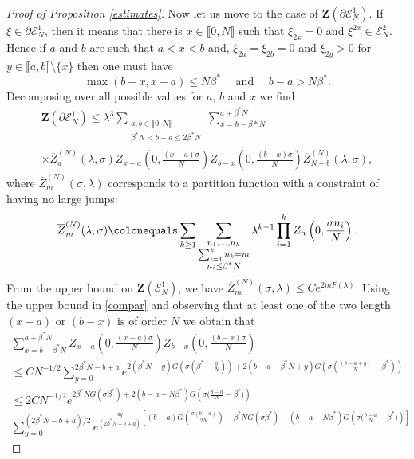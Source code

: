 \documentclass[reqno,11pt]{amsart}
\numberwithin{equation}{section}
\newcommand{\gl}{\lambda}
\newcommand{\cE}{{\ensuremath{\mathcal E}} }
\newcommand{\bZ}{{\ensuremath{\mathbf Z}} }
\newcommand{\lint}{\llbracket}
\newcommand{\rint}{\rrbracket}
\newcommand{\sumtwo}[2]{\sum_{\substack{#1 \\ #2}}} %
\newcommand{\sumthree}[3]{\sum_{\substack{#1 \\ #2 \\ #3}}} %
\begin{document}
\begin{proof}[Proof of Proposition \ref{estimates}]
Now let us move to the case of  $\bZ(\partial \cE^1_N)$. If $\xi \in \partial \cE^1_N$, then it means that there is $x\in\lint 0, N\rint$ such that $\xi_{2x}=0$ and  $\xi^{2x} \in  \cE^2_N$. 
Hence if $a$ and $b$ are such that $a<x<b$ and, $\xi_{2a}=\xi_{2b}=0$ and $\xi_{2y}>0$ for $y\in \lint a,b\rint 
\setminus\{x\}$ then one must have
\begin{equation}\label{abx}
\max(b-x,x-a)\le N \beta^* \quad \text{ and }  \quad b-a> N\beta^*.
\end{equation}
Decomposing over all possible values for $a$, $b$ and $x$ we find 
\begin{multline}\label{zfrontier}
 \bZ(\partial \cE^1_N) \le \gl^3 \sumtwo{a,b\in \lint 0,N\rint} {\beta^* N<b-a \le 2\beta^*N} \sum_{x=b-\beta* N}^{a+\beta^*N}  \\ \times 
 \overline Z^{(N)}_a(\gl,\sigma)Z_{x-a}\left(0,\frac{(x-a)\sigma}{N}\right)Z_{b-x}\left(0,\frac{(b-x)\sigma}{N}\right) \overline Z^{(N)}_{N-b}(\gl,\sigma),
\end{multline}
where   $\overline Z^{(N)}_m(\sigma,\gl)$ corresponds to a partition function with a constraint of having no large jumps:
\begin{equation}
  \overline Z^{(N)}_m(\gl,\sigma) \colonequals \sum_{k\ge 1}\sumthree{n_1,\dots,n_k}{\sum_{i=1}^k n_k=m}{ n_i\le \beta^* N} \gl^{k-1} \prod_{i=1}^k Z_n\left(0,\frac{\sigma n_i}{N}\right).
\end{equation}
From the upper bound  on   $\bZ(\cE^1_N)$, we have   $\overline Z^{(N)}_m(\sigma,\gl)\le C e^{2m F(\gl)}$.
Using the upper bound in  \eqref{compar} and observing that at least one of the two length $(x-a)$ or $(b-x)$ is of order $N$ we obtain that 
\begin{multline}\label{boundarycorner}
 \sum_{x=b-\beta^* N}^{a+\beta^*N} Z_{x-a}\left(0,\frac{(x-a)\sigma}{N}\right)Z_{b-x}\left(0,\frac{(b-x)\sigma}{N}\right)\\
 \le C N^{-1/2} \sum_{y=0}^{2\beta^*N-b+a} e^{2(\beta^*N-y)G\left(\sigma \left(\beta^*-\frac{y}{N}\right)\right)+  2(b-a-\beta^* N+y)G\left(\sigma \left(\frac{(b-a+y)}{N}-\beta^*\right)\right)} \\ \le 2C N^{-1/2} 
 e^{2\beta^* N G\left(\sigma \beta^* \right)+  2(b-a-N \beta^*) G\left( \sigma \big(\frac{b-a}{N}-\beta^*\big)\right)}\\
 \sum_{y=0}^{(2\beta^*N-b+a)/2}
 e^{\frac{4y}{(2\beta^*N-b+a)}\left[(b-a)G\left(\frac{\sigma(b-a)}{2N}\right)-\beta^* N  G\left(\sigma \beta^* \right)-  (b-a-N \beta^*) G\left( \sigma \big(\frac{b-a}{N}-\beta^*\big)\right)\right]}

\end{multline}
\end{proof}
\end{document}
